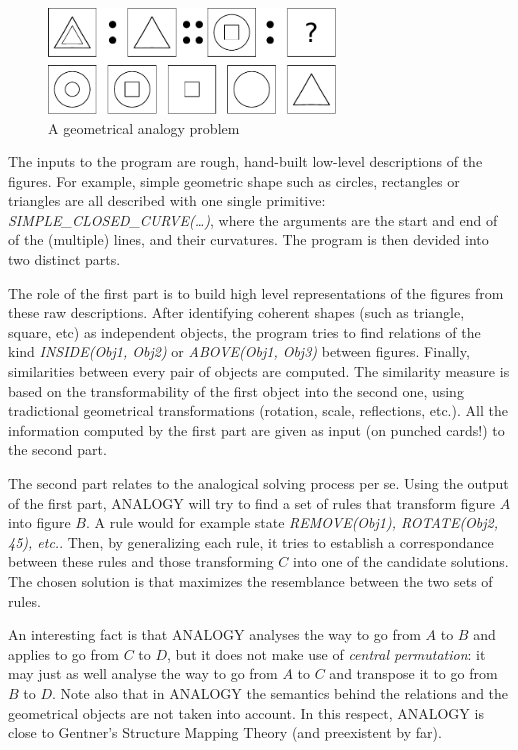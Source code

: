 \begin{figure}[!h]
\centering
\includegraphics[width=3in]{figures/evans.pdf}
\caption{A geometrical analogy problem}
\label{FIG:evans}
\end{figure}

The inputs to the program are rough, hand-built low-level descriptions of the
figures. For example, simple geometric shape such as circles, rectangles or
triangles are all described with one single primitive:
\textit{SIMPLE\_CLOSED\_CURVE(\dots)}, where the arguments are the start and
end of of the (multiple) lines, and their curvatures. The program is then
devided into two distinct parts.

The role of the first part is to build high level representations of the
figures from these raw descriptions. After identifying coherent shapes (such as
triangle, square, etc) as independent objects, the program tries to find
relations of the kind \textit{INSIDE(Obj1, Obj2)} or \textit{ABOVE(Obj1, Obj3)}
between figures. Finally, similarities between every pair of objects are
computed. The similarity measure is based on the transformability of the first
object into the second one, using tradictional geometrical transformations
(rotation, scale, reflections, etc.). All the information computed by the first
part are given as input (on punched cards!) to the second part.

The second part relates to the analogical solving process per se. Using the
output of the first part, ANALOGY will try to find a set of rules that
transform figure $A$ into figure $B$. A rule would for example state
\textit{REMOVE(Obj1), ROTATE(Obj2, 45\degree), etc.}. Then, by generalizing
each rule, it tries to establish a correspondance between these rules and those
transforming $C$ into one of the candidate solutions. The chosen solution is
that maximizes the resemblance between the two sets of rules.

An interesting fact is that ANALOGY analyses the way to go from $A$ to $B$ and
applies to go from $C$ to $D$, but it does not make use of \textit{central
permutation}: it may just as well analyse the way to go from $A$ to $C$ and
transpose it to go from $B$ to $D$. Note also that in ANALOGY the semantics
behind the relations and the geometrical objects are not taken into account. In
this respect, ANALOGY is close to Gentner's Structure Mapping Theory (and
preexistent by far).

